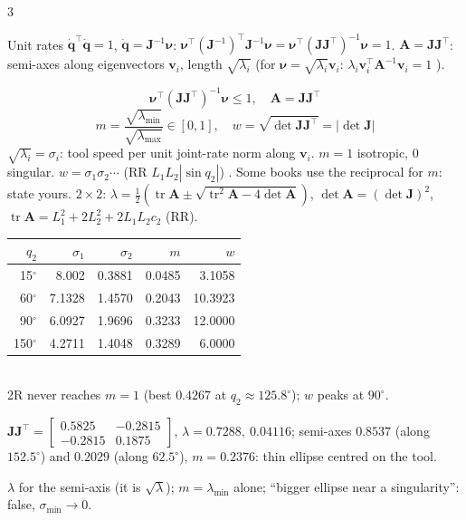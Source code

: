 \begin{multicols}{3}
\begin{deriv}
Unit rates $\dot{\mathbf q}^\top\dot{\mathbf q}=1$, $\dot{\mathbf q}=\mathbf J^{-1}\boldsymbol\nu$: $\boldsymbol\nu^\top(\mathbf J^{-1})^\top\mathbf J^{-1}\boldsymbol\nu=\boldsymbol\nu^\top(\mathbf J\mathbf J^\top)^{-1}\boldsymbol\nu=1$. $\mathbf A=\mathbf J\mathbf J^\top$: semi-axes along eigenvectors $\mathbf v_i$, length $\sqrt{\lambda_i}$ (for $\boldsymbol\nu=\sqrt{\lambda_i}\mathbf v_i$: $\lambda_i\mathbf v_i^\top\mathbf A^{-1}\mathbf v_i=1$ \added).
\end{deriv}
\begin{fbx}
\[\boldsymbol\nu^\top(\mathbf J\mathbf J^\top)^{-1}\boldsymbol\nu\le1,\quad\mathbf A=\mathbf J\mathbf J^\top\]
\[m=\frac{\sqrt{\lambda_{\min}}}{\sqrt{\lambda_{\max}}}\in[0,1],\quad w=\sqrt{\det\mathbf J\mathbf J^\top}=|\det\mathbf J|\]
$\sqrt{\lambda_i}=\sigma_i$: tool speed per unit joint-rate norm along $\mathbf v_i$. $m=1$ isotropic, $0$ singular. $w=\sigma_1\sigma_2\cdots$ (RR $L_1L_2|\sin q_2|$) \added. Some books use the reciprocal for $m$: state yours. $2\times2$: $\lambda=\tfrac12(\operatorname{tr}\mathbf A\pm\sqrt{\operatorname{tr}^2\mathbf A-4\det\mathbf A})$, $\det\mathbf A=(\det\mathbf J)^2$, $\operatorname{tr}\mathbf A=L_1^2+2L_2^2+2L_1L_2c_2$ (RR).
\end{fbx}
\begin{worked}[RR $L=(3,4)$: $\sigma$, $m$, $w$]
{\small\begin{tabular}{@{}rrrrr@{}}\toprule $q_2$&$\sigma_1$&$\sigma_2$&$m$&$w$\\\midrule
15$^\circ$&8.002&0.3881&0.0485&3.1058\\60$^\circ$&7.1328&1.4570&0.2043&10.3923\\90$^\circ$&6.0927&1.9696&0.3233&12.0000\\150$^\circ$&4.2711&1.4048&0.3289&6.0000\\\bottomrule\end{tabular}}\\
2R never reaches $m=1$ (best $0.4267$ at $q_2\approx125.8^\circ$); $w$ peaks at $90^\circ$. \chk
\end{worked}
\begin{worked}[$L=(0.5,0.4)$, $\mathbf q=(30^\circ,60^\circ)$: what to draw]
$\mathbf J\mathbf J^\top=\begin{bmatrix}0.5825&-0.2815\\-0.2815&0.1875\end{bmatrix}$, $\lambda=0.7288,\ 0.04116$; semi-axes $0.8537$ (along $152.5^\circ$) and $0.2029$ (along $62.5^\circ$), $m=0.2376$: thin ellipse centred on the tool. \chk
\end{worked}
\begin{trap}
$\lambda$ for the semi-axis (it is $\sqrt\lambda$); $m=\lambda_{\min}$ alone; ``bigger ellipse near a singularity'': false, $\sigma_{\min}\to0$.
\end{trap}


\end{multicols}

